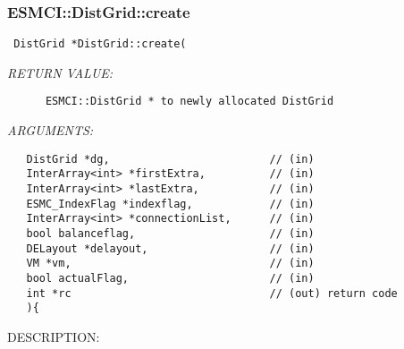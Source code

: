  
\setlength{\oldparskip}{\parskip}
\setlength{\parskip}{1.5ex}
\setlength{\oldparindent}{\parindent}
\setlength{\parindent}{0pt}
\setlength{\oldbaselineskip}{\baselineskip}
\setlength{\baselineskip}{11pt}
 
\def\bv{\begin{verbatim}}
\def\ev{\end{verbatim}}
\def\be{\begin{equation}}
\def\ee{\end{equation}}
\def\bea{\begin{eqnarray}}
\def\eea{\end{eqnarray}}
\def\bi{\begin{itemize}}
\def\ei{\end{itemize}}
\def\bn{\begin{enumerate}}
\def\en{\end{enumerate}}
\def\bd{\begin{description}}
\def\ed{\end{description}}
\def\({\left (}
\def\){\right )}
\def\[{\left [}
\def\]{\right ]}
\def\<{\left  \langle}
\def\>{\right \rangle}
\def\cI{{\cal I}}
\def\diag{\mathop{\rm diag}}
\def\tr{\mathop{\rm tr}}


 
\subsubsection [ESMCI::DistGrid::create] {ESMCI::DistGrid::create}


  
\begin{verbatim} DistGrid *DistGrid::create(\end{verbatim}{\em RETURN VALUE:}
\begin{verbatim}      ESMCI::DistGrid * to newly allocated DistGrid\end{verbatim}{\em ARGUMENTS:}
\begin{verbatim}   DistGrid *dg,                         // (in)
   InterArray<int> *firstExtra,          // (in)
   InterArray<int> *lastExtra,           // (in)
   ESMC_IndexFlag *indexflag,            // (in)
   InterArray<int> *connectionList,      // (in)
   bool balanceflag,                     // (in)
   DELayout *delayout,                   // (in)
   VM *vm,                               // (in)
   bool actualFlag,                      // (in)
   int *rc                               // (out) return code
   ){\end{verbatim}
{\sf DESCRIPTION:\\ }


